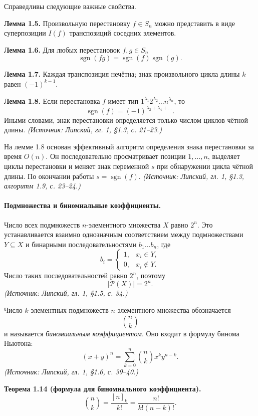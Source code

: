 \documentclass[a4paper,12pt]{article}
\begin{document}
Справедливы следующие важные свойства.

\textbf{Лемма 1.5.} Произвольную перестановку \(f\in S_n\) можно представить в виде суперпозиции \(I(f)\) транспозиций соседних элементов.

\textbf{Лемма 1.6.} Для любых перестановок \(f,g\in S_n\)
\[
\operatorname{sgn}(fg)=\operatorname{sgn}(f)\operatorname{sgn}(g).
\]

\textbf{Лемма 1.7.} Каждая транспозиция нечётна; знак произвольного цикла длины \(k\) равен \((-1)^{k-1}\).

\textbf{Лемма 1.8.} Если перестановка \(f\) имеет тип \(1^{\lambda_1}2^{\lambda_2}\dots n^{\lambda_n}\), то
\[
\operatorname{sgn}(f)=(-1)^{\lambda_2+\lambda_4+\dots}.
\]
Иными словами, знак перестановки определяется только числом циклов чётной длины.
\textit{(Источник: Липский, гл. 1, §1.3, с. 21--23.)}

На лемме 1.8 основан эффективный алгоритм определения знака перестановки за время \(O(n)\). Он последовательно просматривает позиции \(1,\dots,n\), выделяет циклы перестановки и меняет знак переменной \(s\) при обнаружении цикла чётной длины. По окончании работы \(s=\operatorname{sgn}(f)\).
\textit{(Источник: Липский, гл. 1, §1.3, алгоритм 1.9, с. 23--24.)}

\paragraph{Подмножества и биномиальные коэффициенты.}
Число всех подмножеств \(n\)-элементного множества \(X\) равно \(2^n\). Это устанавливается взаимно однозначным соответствием между подмножествами \(Y\subseteq X\) и бинарными последовательностями \(b_1\dots b_n\), где
\[
b_i=
\begin{cases}
1, & x_i\in Y,\\
0, & x_i\notin Y.
\end{cases}
\]
Число таких последовательностей равно \(2^n\), поэтому
\[
|\mathcal P(X)|=2^n.
\]
\textit{(Источник: Липский, гл. 1, §1.5, с. 34.)}

Число \(k\)-элементных подмножеств \(n\)-элементного множества обозначается
\[
\binom{n}{k}
\]
и называется \emph{биномиальным коэффициентом}. Оно входит в формулу бинома Ньютона:
\[
(x+y)^n=\sum_{k=0}^n \binom{n}{k}x^k y^{n-k}.
\]
\textit{(Источник: Липский, гл. 1, §1.6, с. 39--40.)}

\textbf{Теорема 1.14 (формула для биномиального коэффициента).}
\[
\binom{n}{k}=\frac{[n]_k}{k!}=\frac{n!}{k!(n-k)!}.
\]
\end{document}
